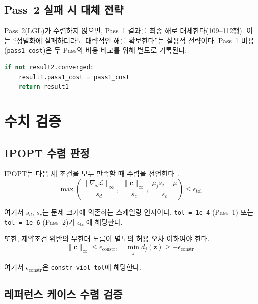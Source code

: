 \documentclass[11pt]{article}
\begin{document}
\subsection{Pass~2 실패 시 대체 전략}

Pass~2(LGL)가 수렴하지 않으면, Pass~1 결과를 최종 해로 대체한다(109--112행). 이는 ``정밀화에 실패하더라도 대략적인 해를 확보한다''는 실용적 전략이다. Pass~1 비용(\texttt{pass1\_cost})은 두 Pass의 비용 비교를 위해 별도로 기록된다.

\begin{lstlisting}[language=Python]
if not result2.converged:
    result1.pass1_cost = pass1_cost
    return result1
\end{lstlisting}


\section{수치 검증}

\subsection{IPOPT 수렴 판정}

IPOPT는 다음 세 조건을 모두 만족할 때 수렴을 선언한다~\cite{Wachter2006}.
%
\begin{equation}\label{eq:ipopt-convergence}
\max\left(\frac{\|\nabla_\mathbf{z} \mathcal{L}\|_\infty}{s_d},\; \frac{\|\mathbf{c}\|_\infty}{s_c},\; \frac{\mu_j s_j - \mu}{s_c}\right) \leq \epsilon_{\text{tol}}
\end{equation}

여기서 $s_d$, $s_c$는 문제 크기에 의존하는 스케일링 인자이다. \texttt{tol = 1e-4} (Pass~1) 또는 \texttt{tol = 1e-6} (Pass~2)가 $\epsilon_{\text{tol}}$에 해당한다.

또한, 제약조건 위반의 무한대 노름이 별도의 허용 오차 이하여야 한다.
%
\begin{equation}\label{eq:constr-viol}
\|\mathbf{c}\|_\infty \leq \epsilon_{\text{constr}}, \quad \min_j d_j(\mathbf{z}) \geq -\epsilon_{\text{constr}}
\end{equation}

여기서 $\epsilon_{\text{constr}}$은 \texttt{constr\_viol\_tol}에 해당한다.

\subsection{레퍼런스 케이스 수렴 검증}
\end{document}
